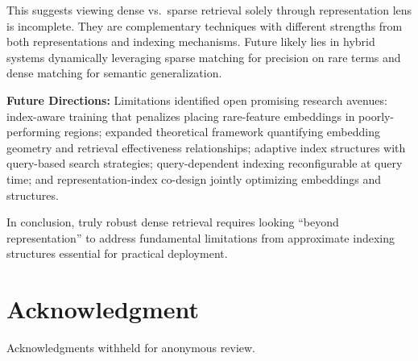 \documentclass[conference,anonymous]{IEEEtran}
\begin{document}
This suggests viewing dense vs.\ sparse retrieval solely through representation lens is incomplete. They are complementary techniques with different strengths from both representations and indexing mechanisms. Future likely lies in hybrid systems dynamically leveraging sparse matching for precision on rare terms and dense matching for semantic generalization.

\textbf{Future Directions:} Limitations identified open promising research avenues: index-aware training that penalizes placing rare-feature embeddings in poorly-performing regions; expanded theoretical framework quantifying embedding geometry and retrieval effectiveness relationships; adaptive index structures with query-based search strategies; query-dependent indexing reconfigurable at query time; and representation-index co-design jointly optimizing embeddings and structures.

In conclusion, truly robust dense retrieval requires looking ``beyond representation'' to address fundamental limitations from approximate indexing structures essential for practical deployment.

\section*{Acknowledgment}

Acknowledgments withheld for anonymous review.
\end{document}
